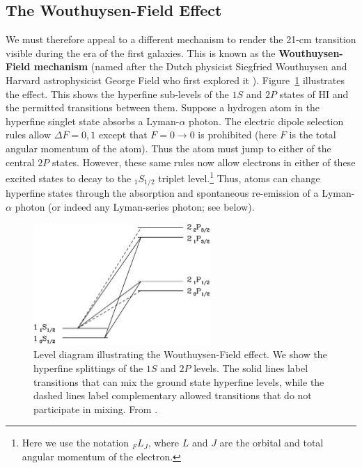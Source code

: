 \documentclass[a4paper,openany, 12pt]{book}
\begin{document}
\subsection{The Wouthuysen-Field Effect} \label{wf}

We must therefore appeal to a different mechanism to render the 21-cm transition visible during the era of the first galaxies.  This is known as the {\bf Wouthuysen-Field mechanism} (named after the Dutch physicist Siegfried
Wouthuysen and Harvard astrophysicist George Field who first explored it \cite{wouthuysen52, field58}). Figure~\ref{fig:wf} illustrates the effect. This shows the hyperfine sub-levels of the $1S$ and $2P$ states of HI and the permitted transitions between them.  Suppose a hydrogen atom in the hyperfine singlet state absorbs a Lyman-$\alpha$ photon.  The electric dipole selection rules allow $\Delta F=0,1$ except that $F=0 \rightarrow 0$ is prohibited (here $F$ is the total angular momentum of the atom).  Thus the atom must jump to either of the central $2P$ states.  However, these same rules now allow electrons in either of these excited states to decay to the $_1S_{1/2}$ triplet level.\footnote{Here we use the notation $_F L_J$, where $L$ and $J$ are the orbital and total angular momentum of the electron.}  Thus, atoms can change hyperfine states through the absorption and spontaneous re-emission of a Lyman-$\alpha$ photon (or indeed any Lyman-series photon; see below).

\begin{figure}[]
\begin{center}
\includegraphics[width=0.6\textwidth]{figure2-2}
\end{center}
\caption{Level diagram illustrating the Wouthuysen-Field effect.  We show the hyperfine splittings of the $1S$ and $2P$ levels.  The solid lines label transitions that can mix the ground state hyperfine levels, while the dashed lines label complementary allowed transitions that do not participate in mixing.  From \cite{pritchard06}.}
\label{fig:wf}
\end{figure}
\end{document}
